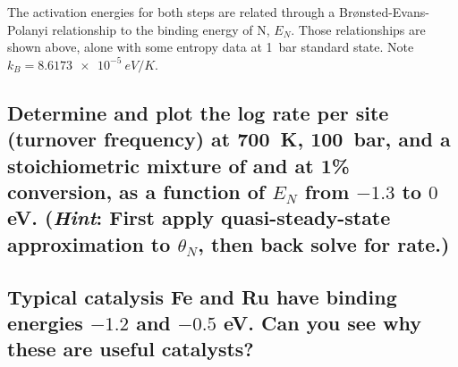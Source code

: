 \documentclass[11pt]{article}
\begin{document}
\noindent The activation energies for both steps are related through a Br\o{}nsted-Evans-Polanyi relationship to the binding energy of N, \(E_N\). Those relationships are shown above, alone with some entropy data at \SI{1}{bar} standard state. Note \(k_B = \SI{8.6173e-5}{eV/K}\).

\subsection{Determine and plot the log rate per site (turnover frequency) at \SI{700}{K}, \SI{100}{bar}, and a stoichiometric mixture of  and  at 1\% conversion, as a function of \(E_N\) from \(-1.3\) to \(0\) eV.  (\emph{Hint}: First apply quasi-steady-state approximation to \(\theta_N\), then back solve for rate.)}
\label{sec:org43038e6}

\subsection{Typical catalysis Fe and Ru have binding energies \(-1.2\)  and \(-0.5\) eV.  Can you see why these are useful catalysts?}
\label{sec:org82062e8}
\end{document}
